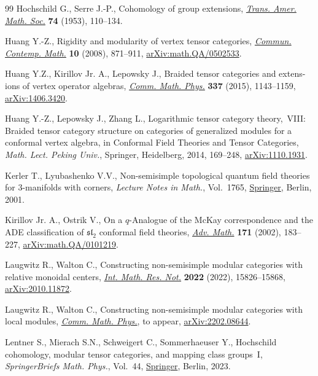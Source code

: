 \begin{thebibliography}{99}
Hochschild G., Serre J.-P., Cohomology of group extensions, \href{https://doi.org/10.2307/1990851}{\textit{Trans. Amer.
 Math. Soc.}} \textbf{74} (1953), 110--134.

Huang Y.-Z., Rigidity and modularity of vertex tensor categories,
 \href{https://doi.org/10.1142/S0219199708003083}{\textit{Commun. Contemp. Math.}} \textbf{10} (2008), 871--911,
 \href{https://arxiv.org/abs/math.QA/0502533}{arXiv:math.QA/0502533}.

Huang Y.Z., Kirillov Jr. A., Lepowsky J., Braided tensor categories and
 extens-ions of vertex operator algebras, \href{https://doi.org/10.1007/s00220-015-2292-1}{\textit{Comm. Math. Phys.}}
 \textbf{337} (2015), 1143--1159, \href{https://arxiv.org/abs/1406.3420}{arXiv:1406.3420}.

Huang Y.-Z., Lepowsky J., Zhang L., Logarithmic tensor category theory,~{VIII}:
 {B}raided tensor category structure on categories of generalized modules for
 a conformal vertex algebra, in Conformal {F}ield {T}heories and {T}ensor
 {C}ategories, \textit{Math. Lect. Peking Univ.}, Springer, Heidelberg, 2014, 169--248,
 \href{https://arxiv.org/abs/1110.1931}{arXiv:1110.1931}.

Kerler T., Lyubashenko V.V., Non-semisimple topological quantum field theories
 for 3-manifolds with corners, \textit{Lecture Notes in Math.}, Vol.~1765,
 \href{https://doi.org/10.1007/b82618}{Springer}, Berlin, 2001.

Kirillov Jr. A., Ostrik V., On a {$q$}-{A}nalogue of the {M}c{K}ay
 correspondence and the {ADE} classification of {$\mathfrak{sl}_2$} conformal
 field theories, \href{https://doi.org/10.1006/aima.2002.2072}{\textit{Adv. Math.}} \textbf{171} (2002), 183--227,
 \href{https://arxiv.org/abs/math.QA/0101219}{arXiv:math.QA/0101219}.

Laugwitz R., Walton C., Constructing non-semisimple modular categories with
 relative monoidal centers, \href{https://doi.org/10.1093/imrn/rnab097}{\textit{Int. Math. Res. Not.}} \textbf{2022}
 (2022), 15826--15868, \href{https://arxiv.org/abs/2010.11872}{arXiv:2010.11872}.

Laugwitz R., Walton C., Constructing non-semisimple modular categories with
 local modules, \href{https://doi.org/10.1007/s00220-023-04824-4}{\textit{Comm. Math. Phys.}}, {t}o appear, \href{https://arxiv.org/abs/2202.08644}{arXiv:2202.08644}.

Lentner S., Mierach S.N., Schweigert C., Sommerhaeuser Y., Hochschild
 cohomology, modular tensor categories, and mapping class groups~{I},
 \textit{SpringerBriefs Math. Phys.}, Vol.~44, \href{https://doi.org/10.1007/978-981-19-4645-5}{Springer}, Berlin, 2023.


\end{thebibliography}
